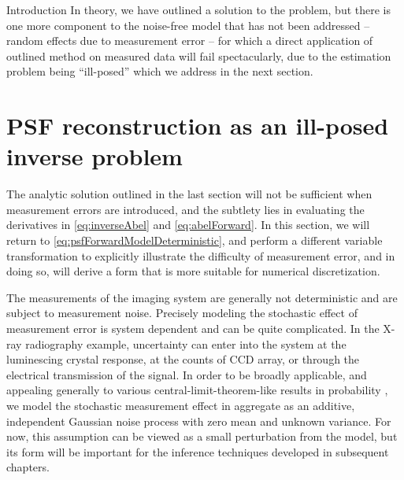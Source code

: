 \begin{chapter}{Introduction}
  In theory, we have outlined a solution to the problem, but there is one more component to the noise-free model that has not been addressed -- random effects due to measurement error -- for which a direct application of outlined method on measured data will fail spectacularly, due to the estimation problem being ``ill-posed'' which we address in the next section.

\section{PSF reconstruction as an ill-posed inverse problem}
  
The analytic solution outlined in the last section will not be sufficient when measurement errors are introduced, and the subtlety lies in evaluating the derivatives in \eqref{eq:inverseAbel} and \eqref{eq:abelForward}.
In this section, we will return to \eqref{eq:psfForwardModelDeterministic}, and perform a different variable transformation to explicitly illustrate the difficulty of measurement error, and in doing so, will derive a form that is more suitable for numerical discretization.

  The measurements of the imaging system are generally not deterministic and are subject to measurement noise.
  Precisely modeling the stochastic effect of measurement error is system dependent and can be quite complicated.
  In the X-ray radiography example, uncertainty can enter into the system at the luminescing crystal response, at the counts of CCD array, or through the electrical transmission of the signal.
  In order to be broadly applicable, and appealing generally to various central-limit-theorem-like results in probability \citep{durrett2010probability}, we model the stochastic measurement effect in aggregate as an additive, independent Gaussian noise process with zero mean and unknown variance.  
  For now, this assumption can be viewed as a small perturbation from the model, but its form will be important for the inference techniques developed in subsequent chapters.


\end{chapter}
